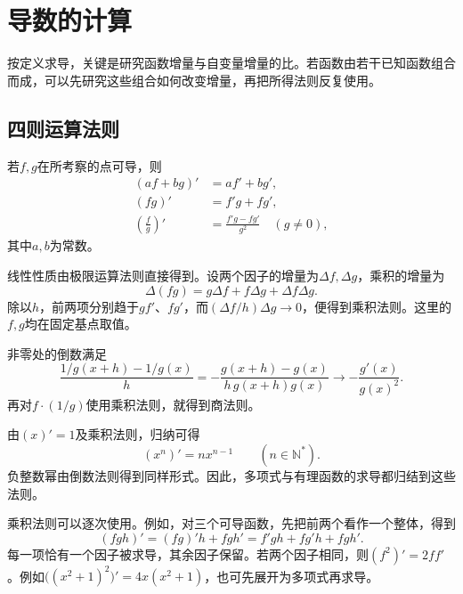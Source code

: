 \FloatBarrier
\newpage
\section{导数的计算}
\label{sec:calculus-differentiation}

\begingroup
\setlength{\parskip}{3.5pt}
\setlength{\abovedisplayskip}{10pt}
\setlength{\belowdisplayskip}{10pt}

按定义求导，关键是研究函数增量与自变量增量的比。若函数由若干已知函数组合而成，可以先研究这些组合如何改变增量，再把所得法则反复使用。

\subsection{四则运算法则}

\begin{theorem}\label{thm:calculus-derivative-rules}
若\(f,g\)在所考察的点可导，则
\begin{equation*}
 \begin{aligned}
 (af+bg)'&=af'+bg',\\
 (fg)'&=f'g+fg',\\
 \left(\frac fg\right)'&=\frac{f'g-fg'}{g^2}\quad(g\ne0),
 \end{aligned}
\end{equation*}
其中\(a,b\)为常数。
\end{theorem}

线性性质由极限运算法则直接得到。设两个因子的增量为\(\Delta f,\Delta g\)，乘积的增量为
\begin{equation*}
 \Delta(fg)=g\Delta f+f\Delta g+\Delta f\Delta g.
\end{equation*}
除以\(h\)，前两项分别趋于\(gf'\)、\(fg'\)，而\((\Delta f/h)\Delta g\to0\)，便得到乘积法则。这里的\(f,g\)均在固定基点取值。

非零处的倒数满足
\begin{equation*}
 \frac{1/g(x+h)-1/g(x)}h
 =-\frac{g(x+h)-g(x)}{h\,g(x+h)g(x)}
 \longrightarrow-\frac{g'(x)}{g(x)^2}.
\end{equation*}
再对\(f\cdot(1/g)\)使用乘积法则，就得到商法则。

由\((x)'=1\)及乘积法则，归纳可得
\begin{equation}\label{eq:calculus-integer-power}
 (x^n)'=nx^{n-1}\qquad(n\in\mathbb N^*).
\end{equation}
负整数幂由倒数法则得到同样形式。因此，多项式与有理函数的求导都归结到这些法则。

乘积法则可以逐次使用。例如，对三个可导函数，先把前两个看作一个整体，得到
\begin{equation*}
 (fgh)'=(fg)'h+fgh'=f'gh+fg'h+fgh'.
\end{equation*}
每一项恰有一个因子被求导，其余因子保留。若两个因子相同，则\((f^2)'=2ff'\)。例如\(\bigl((x^2+1)^2\bigr)'=4x(x^2+1)\)，也可先展开为多项式再求导。

